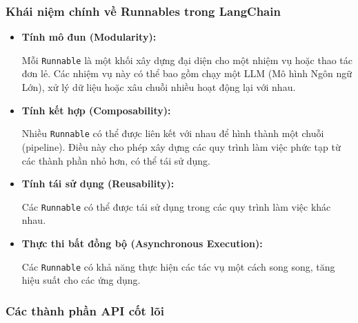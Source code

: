 \documentclass[11pt]{article}
\begin{document}
\subsubsection{Khái niệm chính về Runnables trong LangChain}
\begin{itemize}
    \item \textbf{Tính mô đun (Modularity):}
    \begin{boxC}
        Mỗi \texttt{Runnable} là một khối xây dựng đại diện cho một nhiệm vụ hoặc thao tác đơn lẻ. Các nhiệm vụ này có thể bao gồm chạy một LLM (Mô hình Ngôn ngữ Lớn), xử lý dữ liệu hoặc xâu chuỗi nhiều hoạt động lại với nhau.
    \end{boxC}

    \item \textbf{Tính kết hợp (Composability):}
    \begin{boxC}
        Nhiều \texttt{Runnable} có thể được liên kết với nhau để hình thành một chuỗi (pipeline). Điều này cho phép xây dựng các quy trình làm việc phức tạp từ các thành phần nhỏ hơn, có thể tái sử dụng.
    \end{boxC}

    \item \textbf{Tính tái sử dụng (Reusability):}
    \begin{boxC}
        Các \texttt{Runnable} có thể được tái sử dụng trong các quy trình làm việc khác nhau.
    \end{boxC}

    \item \textbf{Thực thi bất đồng bộ (Asynchronous Execution):}
    \begin{boxC}
        Các \texttt{Runnable} có khả năng thực hiện các tác vụ một cách song song, tăng hiệu suất cho các ứng dụng.
    \end{boxC}
\end{itemize}

\subsubsection{Các thành phần API cốt lõi}
\end{document}
